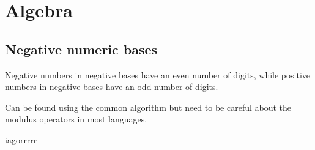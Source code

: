 \section{Algebra}

\subsection{Negative numeric bases}

Negative numbers in negative bases have an even number of digits, while positive numbers in negative bases have an odd number of digits.

Can be found using the common algorithm but need to be careful about the modulus operators in most languages.


iagorrrrr

